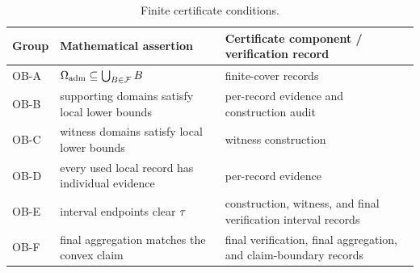 \documentclass[11pt]{article}
\begin{document}
\begin{table}[H]
\centering
\caption{Finite certificate conditions.}
\label{tab:obligations}
\small
\begin{tabularx}{0.97\textwidth}{
    @{\hspace{0.02\textwidth}}
    m{}                           %
    @{\hspace{0.0\textwidth}}
    X                                           %
    @{\hspace{0.05\textwidth}}
    X                                           %
    @{\hspace{0.02\textwidth}}
}
\toprule
Group & Mathematical assertion & Certificate component / verification record \\
\midrule
OB-A & \(\Omega_{\mathrm{adm}}\subseteq\bigcup_{B\in\mathcal{F}}B\) & finite-cover records \\
OB-B & supporting domains satisfy local lower bounds & per-record evidence and construction audit \\
OB-C & witness domains satisfy local lower bounds & witness construction \\
OB-D & every used local record has individual evidence & per-record evidence \\
OB-E & interval endpoints clear \(\tau\) & construction, witness, and final verification interval records \\
OB-F & final aggregation matches the convex claim & final verification, final aggregation, and claim-boundary records \\
\bottomrule
\end{tabularx}
\end{table}
\end{document}
